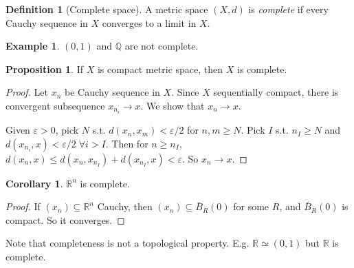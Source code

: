 \documentclass[a4paper,11pt]{article}
\theoremstyle{definition}
\newtheorem*{defn}{Definition}
\newtheorem*{prop}{Proposition}
\newtheorem*{ex}{Example}
\newtheorem*{cor}{Corollary}
\numberwithin{equation}{section}
\begin{document}
\begin{defn}[Complete space]
    A metric space $(X,d)$ is \emph{complete} if every Cauchy sequence in $X$ converges to a limit in $X$.
\end{defn}

\begin{ex}
$(0,1)$ and $\mathbb{Q}$ are not complete.
\end{ex}

\begin{prop}
    If $X$ is compact metric space, then $X$ is complete.
\end{prop}

\begin{proof}
    Let $x_n$ be Cauchy sequence in $X$. Since $X$ sequentially compact, there is convergent subsequence $x_{n_i}\rightarrow x$. We show that $x_n\rightarrow x$.
    
    Given $\varepsilon>0$, pick $N$ s.t. $d(x_n, x_m)<\varepsilon/2$ for $n,m\geq N$. Pick $I$ s.t. $n_I\geq N$ and $d(x_{n_i},x)<\varepsilon/2\;\forall i>I$. Then for $n\geq n_I$, $d(x_n,x)\leq d(x_n,x_{n_I})+d(x_{n_I},x)<\varepsilon$. So $x_n\rightarrow x$.
\end{proof}

\begin{cor}
$\mathbb{R}^n$ is complete. 
\end{cor}

\begin{proof}
    If $(x_n)\subseteq\mathbb{R}^n$ Cauchy, then $(x_n)\subseteq\bar{B}_R(0)$ for some $R$, and $\bar{B}_R(0)$ is compact. So it converges.
\end{proof}

Note that completeness is not a topological property. E.g. $\mathbb{R}\simeq(0,1)$ but $\mathbb{R}$ is complete.
\end{document}
